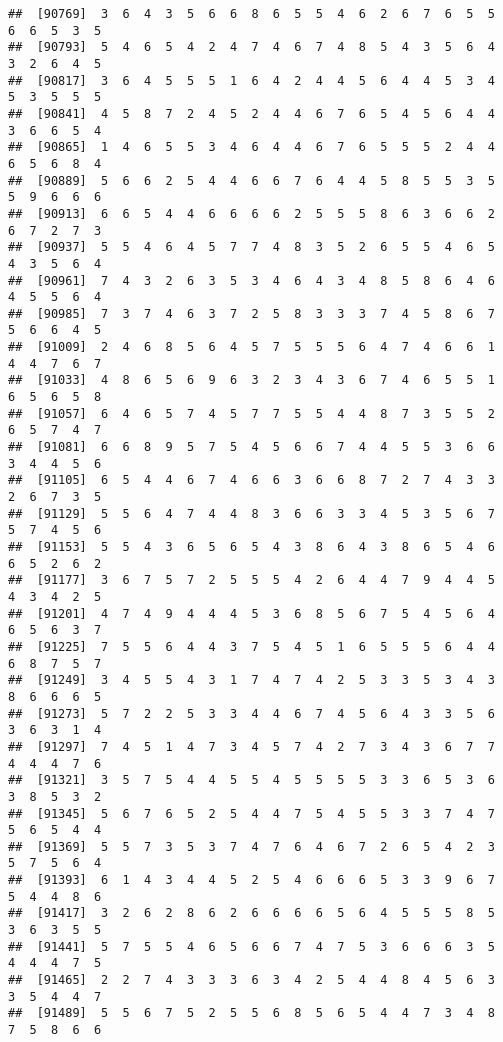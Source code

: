 \documentclass[
]{book}
\begin{document}
\begin{verbatim}
##  [90769]  3  6  4  3  5  6  6  8  6  5  5  4  6  2  6  7  6  5  5  6  6  5  3  5
##  [90793]  5  4  6  5  4  2  4  7  4  6  7  4  8  5  4  3  5  6  4  3  2  6  4  5
##  [90817]  3  6  4  5  5  5  1  6  4  2  4  4  5  6  4  4  5  3  4  5  3  5  5  5
##  [90841]  4  5  8  7  2  4  5  2  4  4  6  7  6  5  4  5  6  4  4  3  6  6  5  4
##  [90865]  1  4  6  5  5  3  4  6  4  4  6  7  6  5  5  5  2  4  4  6  5  6  8  4
##  [90889]  5  6  6  2  5  4  4  6  6  7  6  4  4  5  8  5  5  3  5  5  9  6  6  6
##  [90913]  6  6  5  4  4  6  6  6  6  2  5  5  5  8  6  3  6  6  2  6  7  2  7  3
##  [90937]  5  5  4  6  4  5  7  7  4  8  3  5  2  6  5  5  4  6  5  4  3  5  6  4
##  [90961]  7  4  3  2  6  3  5  3  4  6  4  3  4  8  5  8  6  4  6  4  5  5  6  4
##  [90985]  7  3  7  4  6  3  7  2  5  8  3  3  3  7  4  5  8  6  7  5  6  6  4  5
##  [91009]  2  4  6  8  5  6  4  5  7  5  5  5  6  4  7  4  6  6  1  4  4  7  6  7
##  [91033]  4  8  6  5  6  9  6  3  2  3  4  3  6  7  4  6  5  5  1  6  5  6  5  8
##  [91057]  6  4  6  5  7  4  5  7  7  5  5  4  4  8  7  3  5  5  2  6  5  7  4  7
##  [91081]  6  6  8  9  5  7  5  4  5  6  6  7  4  4  5  5  3  6  6  3  4  4  5  6
##  [91105]  6  5  4  4  6  7  4  6  6  3  6  6  8  7  2  7  4  3  3  2  6  7  3  5
##  [91129]  5  5  6  4  7  4  4  8  3  6  6  3  3  4  5  3  5  6  7  5  7  4  5  6
##  [91153]  5  5  4  3  6  5  6  5  4  3  8  6  4  3  8  6  5  4  6  6  5  2  6  2
##  [91177]  3  6  7  5  7  2  5  5  5  4  2  6  4  4  7  9  4  4  5  4  3  4  2  5
##  [91201]  4  7  4  9  4  4  4  5  3  6  8  5  6  7  5  4  5  6  4  6  5  6  3  7
##  [91225]  7  5  5  6  4  4  3  7  5  4  5  1  6  5  5  5  6  4  4  6  8  7  5  7
##  [91249]  3  4  5  5  4  3  1  7  4  7  4  2  5  3  3  5  3  4  3  8  6  6  6  5
##  [91273]  5  7  2  2  5  3  3  4  4  6  7  4  5  6  4  3  3  5  6  3  6  3  1  4
##  [91297]  7  4  5  1  4  7  3  4  5  7  4  2  7  3  4  3  6  7  7  4  4  4  7  6
##  [91321]  3  5  7  5  4  4  5  5  4  5  5  5  5  3  3  6  5  3  6  3  8  5  3  2
##  [91345]  5  6  7  6  5  2  5  4  4  7  5  4  5  5  3  3  7  4  7  5  6  5  4  4
##  [91369]  5  5  7  3  5  3  7  4  7  6  4  6  7  2  6  5  4  2  3  5  7  5  6  4
##  [91393]  6  1  4  3  4  4  5  2  5  4  6  6  6  5  3  3  9  6  7  5  4  4  8  6
##  [91417]  3  2  6  2  8  6  2  6  6  6  6  5  6  4  5  5  5  8  5  3  6  3  5  5
##  [91441]  5  7  5  5  4  6  5  6  6  7  4  7  5  3  6  6  6  3  5  4  4  4  7  5
##  [91465]  2  2  7  4  3  3  3  6  3  4  2  5  4  4  8  4  5  6  3  3  5  4  4  7
##  [91489]  5  5  6  7  5  2  5  5  6  8  5  6  5  4  4  7  3  4  8  7  5  8  6  6

\end{verbatim}
\end{document}

